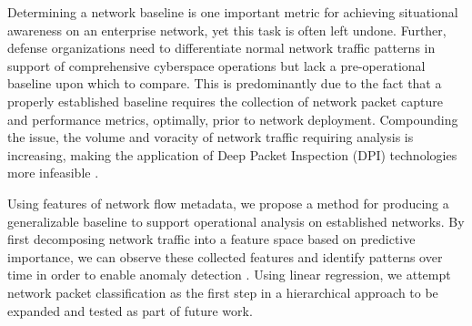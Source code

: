 Determining a network baseline is one important metric for achieving situational awareness on an enterprise network, yet this task is often left undone. Further, defense organizations need to differentiate normal network traffic patterns in support of comprehensive cyberspace operations but lack a pre-operational baseline upon which to compare. This is predominantly due to the fact that a properly established baseline requires the collection of network packet capture and performance metrics, optimally, prior to network deployment. Compounding the issue, the volume and voracity of network traffic requiring analysis is increasing, making the application of Deep Packet Inspection (DPI) technologies more infeasible \cite{epstein_2017}\cite{doi:10.1137/1.9781611972733.3}.

Using features of network flow metadata, we propose a method for producing a generalizable baseline to support operational analysis on established networks. By first decomposing network traffic into a feature space based on predictive importance, we can observe these collected features and identify patterns over time in order to enable anomaly detection \cite{1212675}.  Using linear regression, we attempt network packet classification as the first step in a hierarchical approach to be expanded and tested as part of future work.